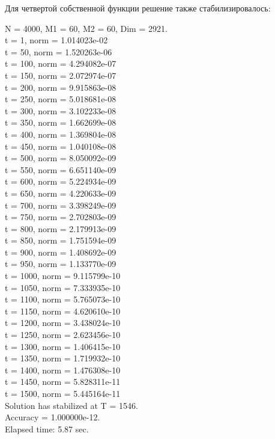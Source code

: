 \documentclass[12pt,a4paper]{article}
\begin{document}
Для четвертой собственной функции решение также стабилизировалось:
\begin{center}
N = 4000, M1 =  60, M2 =  60, Dim =   2921. \\
t =   1, norm = 1.014023e-02 \\
t =  50, norm = 1.520263e-06 \\
t = 100, norm = 4.294082e-07 \\
t = 150, norm = 2.072974e-07 \\
t = 200, norm = 9.915863e-08 \\
t = 250, norm = 5.018681e-08 \\
t = 300, norm = 3.102233e-08 \\
t = 350, norm = 1.662699e-08 \\
t = 400, norm = 1.369804e-08 \\
t = 450, norm = 1.040108e-08 \\
t = 500, norm = 8.050092e-09 \\
t = 550, norm = 6.651140e-09 \\
t = 600, norm = 5.224934e-09 \\
t = 650, norm = 4.220633e-09 \\
t = 700, norm = 3.398249e-09 \\
t = 750, norm = 2.702803e-09 \\
t = 800, norm = 2.179913e-09 \\
t = 850, norm = 1.751594e-09 \\
t = 900, norm = 1.408692e-09 \\
t = 950, norm = 1.133770e-09 \\
t = 1000, norm = 9.115799e-10 \\
t = 1050, norm = 7.333935e-10 \\
t = 1100, norm = 5.765073e-10 \\
t = 1150, norm = 4.620610e-10 \\
t = 1200, norm = 3.438024e-10 \\
t = 1250, norm = 2.623456e-10 \\
t = 1300, norm = 1.406415e-10 \\
t = 1350, norm = 1.719932e-10 \\
t = 1400, norm = 1.476308e-10 \\
t = 1450, norm = 5.828311e-11 \\
t = 1500, norm = 5.445164e-11 \\
Solution has stabilized at T = 1546. \\
Accuracy = 1.000000e-12. \\
Elapsed time: 5.87 sec.
\end{center}
\end{document}
